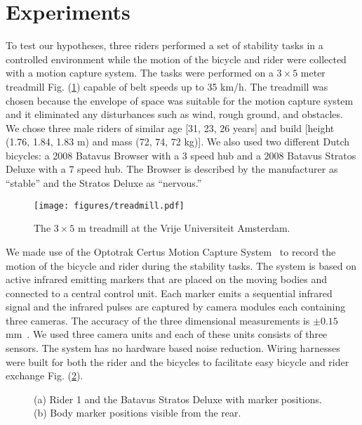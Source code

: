 \documentclass[smallextended]{svjour3}     %
\begin{document}
\section{Experiments}
\label{sec:exp}
To test our hypotheses, three riders performed a set of stability tasks in a
controlled environment while the motion of the bicycle and rider were collected
with a motion capture system. The tasks were performed on a $3\times5$ meter
treadmill Fig. (\ref{fig:treadmill}) capable of belt speeds up to 35 km/h. The
treadmill was chosen because the envelope of space was suitable for the motion
capture system and it eliminated any disturbances such as wind, rough ground,
and obstacles.  We chose three male riders of similar age [31, 23, 26 years] and
build [height (1.76, 1.84, 1.83 m) and mass (72, 74, 72 kg)]. We also used two
different Dutch bicycles: a 2008 Batavus
Browser with a 3 speed hub and a 2008 Batavus Stratos Deluxe with a 7 speed
hub. The Browser is described by the manufacturer as ``stable'' and the Stratos
Deluxe as ``nervous.''
\begin{figure}
    \centering
        \texttt{[image: figures/treadmill.pdf]}
    \caption{The $3\times5$ m treadmill at the Vrije Universiteit Amsterdam.}
    \label{fig:treadmill}
\end{figure}

We made use of the Optotrak Certus Motion Capture
System~\cite{NorthernDigitalIncorporated2009} to record the motion of the
bicycle and rider during the stability tasks. The system is based on active
infrared emitting markers that are placed on the moving bodies and connected to
a central control unit. Each marker emits a sequential infrared signal and the
infrared pulses are captured by camera modules each
containing three cameras. The accuracy of the three dimensional measurements is
$\pm0.15$ mm~\cite{NorthernDigitalIncorporated2009}. We used three camera units
and each of these units consists of
three sensors. The system has no hardware based noise reduction. Wiring
harnesses were built for both the rider and the bicycles to facilitate easy
bicycle and rider exchange Fig. (\ref{fig:markers}).
\begin{figure}
    \centering
    \caption{(a) Rider 1 and the Batavus Stratos Deluxe with marker positions. (b) Body marker positions visible from the rear.}
    \label{fig:markers}
\end{figure}
\end{document}
